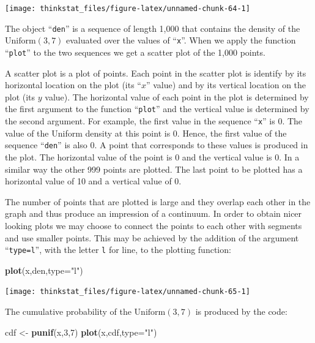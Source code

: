 \documentclass[]{krantz}
\makeatletter
\newenvironment{Shaded}{\begin{snugshade}}{\end{snugshade}}
\newcommand{\KeywordTok}[1]{\textcolor[rgb]{0.13,0.29,0.53}{\textbf{#1}}}
\newcommand{\DataTypeTok}[1]{\textcolor[rgb]{0.13,0.29,0.53}{#1}}
\newcommand{\DecValTok}[1]{\textcolor[rgb]{0.00,0.00,0.81}{#1}}
\newcommand{\StringTok}[1]{\textcolor[rgb]{0.31,0.60,0.02}{#1}}
\newcommand{\NormalTok}[1]{#1}
\newenvironment{kframe}{%
\medskip{}
\setlength{\fboxsep}{.8em}
 \def\at@end@of@kframe{}%
 \ifinner\ifhmode%
  \def\at@end@of@kframe{\end{minipage}}%
  \begin{minipage}{\columnwidth}%
 \fi\fi%
 \def\FrameCommand##1{\hskip\@totalleftmargin \hskip-\fboxsep
 \colorbox{shadecolor}{##1}\hskip-\fboxsep
     \hskip-\linewidth \hskip-\@totalleftmargin \hskip\columnwidth}%
 \MakeFramed {\advance\hsize-\width
   \@totalleftmargin\z@ \linewidth\hsize
   \@setminipage}}%
 {\par\unskip\endMakeFramed%
 \at@end@of@kframe}
\renewenvironment{Shaded}{\begin{kframe}}{\end{kframe}}
\theoremstyle{definition}
\theoremstyle{definition}
\theoremstyle{definition}
\theoremstyle{remark}
\makeatother
\begin{document}
\begin{center}\texttt{[image: thinkstat\_files/figure-latex/unnamed-chunk-64-1]} \end{center}

The object ``\texttt{den}'' is a sequence of length 1,000 that contains
the density of the \(\mathrm{Uniform}(3,7)\) evaluated over the values
of ``\texttt{x}''. When we apply the function ``\texttt{plot}'' to the
two sequences we get a scatter plot of the 1,000 points.

A scatter plot is a plot of points. Each point in the scatter plot is
identify by its horizontal location on the plot (its ``\(x\)'' value)
and by its vertical location on the plot (its \(y\) value). The
horizontal value of each point in the plot is determined by the first
argument to the function ``\texttt{plot}'' and the vertical value is
determined by the second argument. For example, the first value in the
sequence ``\texttt{x}'' is 0. The value of the Uniform density at this
point is 0. Hence, the first value of the sequence ``\texttt{den}'' is
also 0. A point that corresponds to these values is produced in the
plot. The horizontal value of the point is 0 and the vertical value is
0. In a similar way the other 999 points are plotted. The last point to
be plotted has a horizontal value of 10 and a vertical value of 0.

The number of points that are plotted is large and they overlap each
other in the graph and thus produce an impression of a continuum. In
order to obtain nicer looking plots we may choose to connect the points
to each other with segments and use smaller points. This may be achieved
by the addition of the argument ``\texttt{type=l}'', with the letter
\texttt{l} for line, to the plotting function:

\begin{Shaded}
\begin{Highlighting}[]
\KeywordTok{plot}\NormalTok{(x,den,}\DataTypeTok{type=}\StringTok{"l"}\NormalTok{)}
\end{Highlighting}
\end{Shaded}

\begin{center}\texttt{[image: thinkstat\_files/figure-latex/unnamed-chunk-65-1]} \end{center}

The cumulative probability of the \(\mathrm{Uniform}(3,7)\) is produced
by the code:

\begin{Shaded}
\begin{Highlighting}[]
\NormalTok{cdf <-}\StringTok{ }\KeywordTok{punif}\NormalTok{(x,}\DecValTok{3}\NormalTok{,}\DecValTok{7}\NormalTok{)}
\KeywordTok{plot}\NormalTok{(x,cdf,}\DataTypeTok{type=}\StringTok{"l"}\NormalTok{)}
\end{Highlighting}
\end{Shaded}
\end{document}
